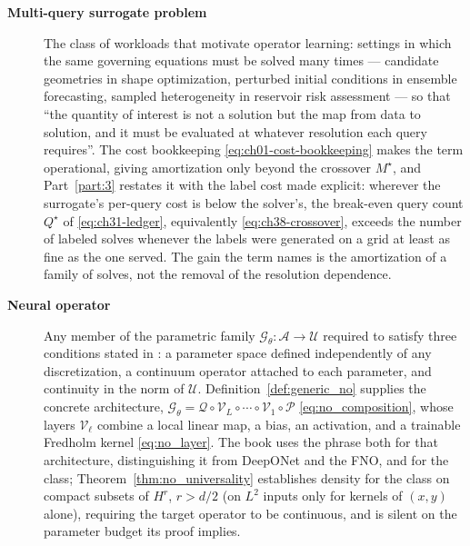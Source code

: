 \begin{description}
\item[\textbf{Multi-query surrogate problem}] The class of workloads that motivate
operator learning: settings in which the same governing
equations must be solved many times --- candidate geometries in shape optimization,
perturbed initial conditions in ensemble forecasting, sampled heterogeneity in reservoir
risk assessment --- so that ``the quantity of interest is not a solution but the map from
data to solution, and it must be evaluated at whatever resolution each query requires''.
The cost bookkeeping \eqref{eq:ch01-cost-bookkeeping} makes the term operational, giving
amortization only beyond the crossover $M^{\star}$, and Part~\ref{part:3} restates it with
the label cost made explicit: wherever the surrogate's per-query cost is below the
solver's, the break-even query count $Q^{\star}$ of \eqref{eq:ch31-ledger}, equivalently
\eqref{eq:ch38-crossover}, exceeds the number of labeled solves whenever the labels were
generated on a grid at least as fine as the one served. The gain the term names is the
amortization of a family of solves, not the removal of the resolution dependence. 

\item[\textbf{Neural operator}] Any member of the parametric family
$\mathcal{G}_{\theta} : \mathcal{A} \to \mathcal{U}$ required to satisfy three conditions
stated in : a parameter space
defined independently of any discretization, a continuum operator attached to each
parameter, and continuity in the norm of $\mathcal{U}$. Definition~\ref{def:generic_no}
supplies the concrete architecture, $\mathcal{G}_{\theta} = \mathcal{Q} \circ \mathcal{V}_{L}
\circ \cdots \circ \mathcal{V}_{1} \circ \mathcal{P}$ \eqref{eq:no_composition}, whose layers
$\mathcal{V}_{\ell}$ combine a local linear map, a bias, an activation, and a trainable
Fredholm kernel \eqref{eq:no_layer}. The book uses the phrase both for that architecture,
distinguishing it from DeepONet and the FNO, and for the class; Theorem~\ref{thm:no_universality}
establishes density for the class on compact subsets of $H^{r}$, $r > d/2$ (on
$L^{2}$ inputs only for kernels of $(x,y)$ alone), requiring the target
operator to be continuous, and is silent on the parameter budget its proof implies.


\end{description}
